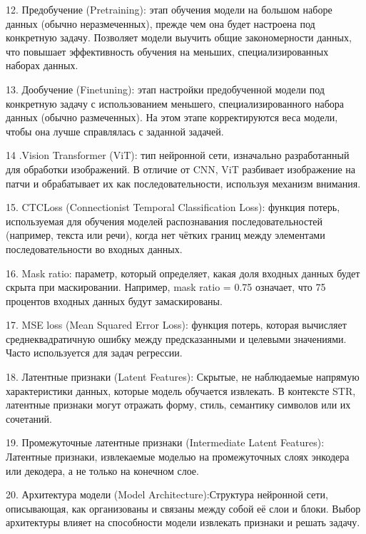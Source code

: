 12. Предобучение (Pretraining):  этап обучения модели на большом наборе данных (обычно неразмеченных),  прежде чем она будет настроена под конкретную задачу.  Позволяет модели  выучить общие закономерности данных, что  повышает  эффективность  обучения на меньших, специализированных наборах данных.

13. Дообучение (Finetuning):  этап  настройки  предобученной  модели  под  конкретную задачу с использованием  меньшего, специализированного набора данных (обычно размеченных). На этом этапе  корректируются  веса модели,  чтобы  она  лучше  справлялась  с  заданной  задачей. 

14 .Vision Transformer (ViT): тип  нейронной  сети,  изначально  разработанный  для  обработки  изображений.  В  отличие  от  CNN, ViT  разбивает  изображение  на  патчи  и  обрабатывает  их  как  последовательности, используя  механизм  внимания.  

15. CTCLoss (Connectionist Temporal Classification Loss): функция  потерь,  используемая  для  обучения  моделей  распознавания  последовательностей  (например,  текста  или  речи),  когда  нет  чётких  границ  между  элементами  последовательности  во  входных  данных. 

16. Mask ratio:  параметр,  который  определяет,  какая  доля  входных  данных  будет  скрыта  при  маскировании.  Например,  mask ratio = 0.75  означает,  что  75 процентов  входных  данных  будут  замаскированы. 

17. MSE loss (Mean Squared Error Loss): функция потерь, которая вычисляет среднеквадратичную ошибку между предсказанными и целевыми значениями. Часто используется для задач регрессии.

18. Латентные признаки (Latent Features): Скрытые, не наблюдаемые напрямую характеристики данных, которые модель обучается извлекать.  В контексте STR,  латентные  признаки могут  отражать форму,  стиль,  семантику  символов или их сочетаний. 

19. Промежуточные латентные признаки (Intermediate Latent Features): Латентные признаки,  извлекаемые  моделью на промежуточных слоях энкодера или декодера, а не только на конечном слое.   

20. Архитектура модели (Model Architecture):Структура  нейронной  сети,  описывающая,  как  организованы  и  связаны  между  собой  её  слои  и  блоки.  Выбор  архитектуры  влияет на  способности  модели  извлекать  признаки  и  решать  задачу.

\newpage
